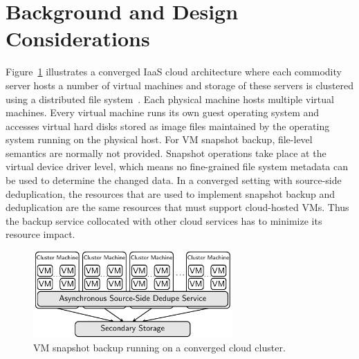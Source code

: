 \section{Background and Design Considerations}
\label{sect:background}

Figure~\ref{fig:collocated} illustrates a converged IaaS cloud architecture 
where
each commodity server hosts a number of virtual machines and storage of these servers
is clustered using a distributed file system~\cite{googlefs03,hdfs10}.
Each physical machine hosts multiple virtual machines.  Every virtual machine
runs its own guest operating system and accesses virtual hard disks 
stored as image files maintained by the operating system running on the
physical host. 
For VM snapshot backup, file-level semantics are normally not provided.
Snapshot operations take place at the virtual device driver level, which
means no fine-grained file system metadata can be used to determine the changed data. 
In a converged setting with source-side deduplication, the resources that are used to implement snapshot
backup and deduplication are the same resources that must support cloud-hosted
VMs.  Thus the backup service collocated with 
other cloud services has to minimize its resource impact.  





\begin{figure}[htb]
    \centering
    \includegraphics[width=3in]{images/converged_arch}
    \caption{VM snapshot backup running on a converged cloud cluster.}
    \label{fig:collocated}
\end{figure}


